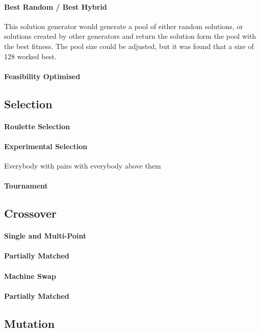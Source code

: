 \documentclass[14pt]{acmsiggraph}
\begin{document}
\paragraph{Best Random / Best Hybrid}
This solution generator would generate a pool of either random solutions, or solutions created by other generators and return the solution form the pool with the best fitness. The pool size could be adjusted, but it was found that a size of 128 worked best.

\paragraph{Feasibility Optimised}

\lipsum[7]
\subsection{Selection}

\paragraph{Roulette Selection}
\paragraph{Experimental Selection}
Everybody with pairs with everybody above them
\paragraph{Tournament}

\subsection{Crossover}
\paragraph{Single and Multi-Point}
\paragraph{Partially Matched }
\paragraph{Machine Swap}
\paragraph{Partially Matched }
\lipsum[7]
\subsection{Mutation}
\lipsum[7]
\end{document}
